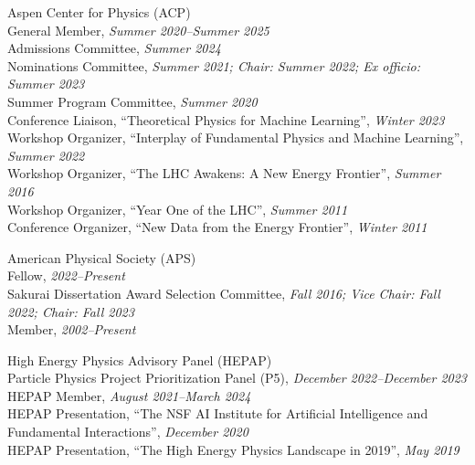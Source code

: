\item Aspen Center for Physics (ACP)
\\ General Member, \emph{Summer 2020--Summer 2025}
\\ Admissions Committee, \emph{Summer 2024}
\\ Nominations Committee, \emph{Summer 2021; Chair: Summer 2022; Ex officio: Summer 2023}
\\ Summer Program Committee, \emph{Summer 2020}
\\ Conference Liaison, ``Theoretical Physics for Machine Learning'', \emph{Winter 2023}
\\ Workshop Organizer, ``Interplay of Fundamental Physics and Machine Learning'', \emph{Summer 2022}
\\ Workshop Organizer, ``The LHC Awakens: A New Energy Frontier'', \emph{Summer 2016}
\\ Workshop Organizer, ``Year One of the LHC'', \emph{Summer 2011}
\\ Conference Organizer, ``New Data from the Energy Frontier'', \emph{Winter 2011}
\item American Physical Society (APS)
\\ Fellow, \emph{2022--Present}
\\ Sakurai Dissertation Award Selection Committee, \emph{Fall 2016; Vice Chair: Fall 2022; Chair: Fall 2023}
\\ Member, \emph{2002--Present}
\item High Energy Physics Advisory Panel (HEPAP)
\\ Particle Physics Project Prioritization Panel (P5), \emph{December 2022--December 2023}
\\ HEPAP Member, \emph{August 2021--March 2024}
\\ HEPAP Presentation, ``The NSF AI Institute for Artificial Intelligence and Fundamental Interactions'', \emph{December 2020}
\\ HEPAP Presentation, ``The High Energy Physics Landscape in 2019'', \emph{May 2019}
